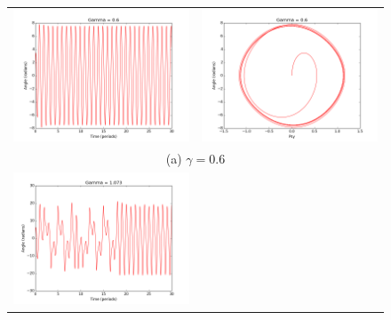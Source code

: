\documentclass[11pt]{article}
\begin{document}
\begin{figure}[ht]
\begin{tabular}{cc}
\includegraphics[scale=.4]{g6theta.png}&

\includegraphics[scale=.4]{g6psy.png} \\
\multicolumn{2}{c}{(a) $\gamma = 0.6 $} \\[6pt]

\includegraphics[scale=.4]{g073theta.png}&


\end{tabular}
\end{figure}
\end{document}
